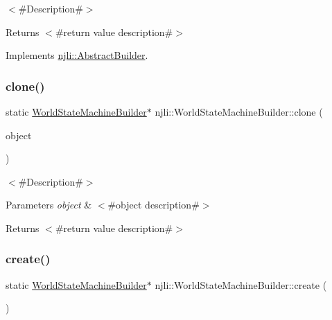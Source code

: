 $<$\#\+Description\#$>$

\begin{DoxyReturn}{Returns}
$<$\#return value description\#$>$ 
\end{DoxyReturn}


Implements \mbox{\hyperlink{classnjli_1_1_abstract_builder_aa1d220053e182c37b31b427499c6eacf}{njli\+::\+Abstract\+Builder}}.

\mbox{\label{classnjli_1_1_world_state_machine_builder_a13011cd872e644fcf3982f21a59bbd5f}} 
\subsubsection{\texorpdfstring{clone()}{clone()}}
{\footnotesize\ttfamily static \mbox{\hyperlink{classnjli_1_1_world_state_machine_builder}{World\+State\+Machine\+Builder}}$\ast$ njli\+::\+World\+State\+Machine\+Builder\+::clone (\begin{DoxyParamCaption}\item[{const \mbox{\hyperlink{classnjli_1_1_world_state_machine_builder}{World\+State\+Machine\+Builder}} \&}]{object }\end{DoxyParamCaption})\hspace{0.3cm}{\ttfamily [static]}}

$<$\#\+Description\#$>$


\begin{DoxyParams}{Parameters}
{\em object} & $<$\#object description\#$>$\\
\hline
\end{DoxyParams}
\begin{DoxyReturn}{Returns}
$<$\#return value description\#$>$ 
\end{DoxyReturn}
\mbox{\label{classnjli_1_1_world_state_machine_builder_ac2aed386f8ffef5a860894d455b0b9e8}} 
\subsubsection{\texorpdfstring{create()}{create()}}
{\footnotesize\ttfamily static \mbox{\hyperlink{classnjli_1_1_world_state_machine_builder}{World\+State\+Machine\+Builder}}$\ast$ njli\+::\+World\+State\+Machine\+Builder\+::create (\begin{DoxyParamCaption}{ }\end{DoxyParamCaption})\hspace{0.3cm}{\ttfamily [static]}}

